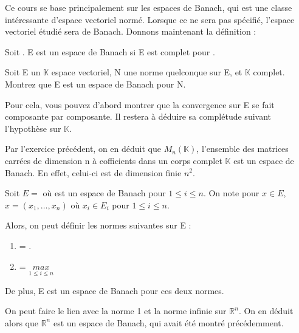 Ce cours se base principalement sur les espaces de Banach, qui est une classe
intéressante d'espace vectoriel normé. Lorsque ce ne sera pas spécifié, l'espace
vectoriel étudié sera de Banach. Donnons maintenant la définition :

\begin{definition}
	Soit . E est un espace de Banach si E est
	complet pour .
\end{definition}

\begin{exercice}
	Soit E un $\mathbb{K}$ espace vectoriel, N une norme quelconque sur E, et
	$\mathbb{K}$ complet. 
	Montrez que E est un espace de Banach pour N.
	
	Pour cela, vous pouvez d'abord montrer que la convergence sur E se fait
	composante par composante. Il restera à déduire sa complétude suivant
	l'hypothèse sur $\mathbb{K}$.
\end{exercice}

\begin{exemple}
	Par l'exercice précédent, on en déduit que $M_{n}(\mathbb{K})$, l'ensemble
	des matrices carrées de dimension n à cofficients dans un corps complet
	$\mathbb{K}$ est un espace de Banach. En effet, celui-ci est de dimension
	finie $n^{2}$.
\end{exemple}

\begin{proposition}
	Soit $E = $ où 
	est un espace de Banach pour $1 \leq i \leq n$.
	On note pour $x \in E$, $x = (x_{1}, \ldots, x_{n})$ où $x_{i} \in
	E_{i}$ pour $1 \leq i \leq n$.
	
	Alors, on peut définir les normes suivantes sur E :
	\begin{enumerate}
		\item {} = .
		\item {} = $\underset{1 \leq i \leq
			n}{max}$
	\end{enumerate}

	De plus, E est un espace de Banach pour ces deux normes.
\end{proposition}

\begin{exemple}
	On peut faire le lien avec la norme 1 et la norme infinie sur
	$\mathbb{R}^{n}$. On en déduit alors que $\mathbb{R}^{n}$ est un espace de
	Banach, qui avait été montré précédemment.
\end{exemple}

